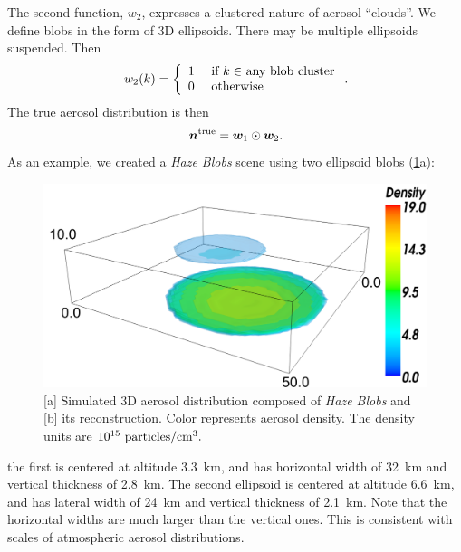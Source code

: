 \documentclass[10pt,letterpaper]{article}
\newcommand{\yoavcomment}[1]{}
\renewcommand{\yoavcomment}[1]{#1} %
\begin{document}
The second function, $w_2$, expresses a clustered nature of aerosol
``clouds''. We define blobs in the form of 3D ellipsoids. There may be
multiple ellipsoids suspended.  Then
\begin{equation}
  w_2(k) =
  \left\{
    \begin{array}{ll}
      1  & \mbox{ if $k\in$ any blob cluster} \\
      0  & \mbox{ otherwise}
      \label{eq:f2}
    \end{array}
  \right.
  .
  \hspace{-0.05cm}
\end{equation}
The true aerosol distribution is then
\begin{equation}
  \label{eq:ntrue}
  {\bm n}^{\rm true}={\bm w}_1\odot {\bm w}_2  .
  \hspace{-0.05cm}
\end{equation}
As an example, we created a {\em Haze Blobs} scene using two ellipsoid
blobs (\cref{fig:simulation1}a):
\begin{figure} \centering
  \yoavcomment{\includegraphics[width=\columnwidth]{images/simulation1}}
  \caption{\small [a] Simulated 3D aerosol distribution composed of
    {\em Haze Blobs} and [b] its reconstruction. Color represents
    aerosol density. The density units are $10^{15}~{\rm
      particles}/{\rm cm}^3.$}
  \label{fig:simulation1}
\end{figure}
the first is centered at altitude \SI{3.3}{\km}, and has horizontal
width of \SI{32}{\km} and vertical thickness of \SI{2.8}{\km}. The
second ellipsoid is centered at altitude \SI{6.6}{\km}, and has
lateral width of \SI{24}{\km} and vertical thickness of
\SI{2.1}{\km}. Note that the horizontal widths are much larger than
the vertical ones. This is consistent with scales of atmospheric
aerosol distributions.
\end{document}
